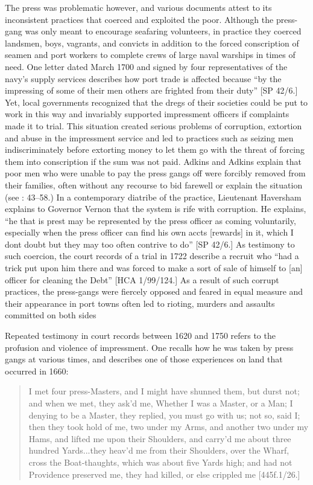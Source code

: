 The press was problematic however, and various documents attest to its inconsistent practices that coerced and exploited the poor. Although the press-gang was only meant to encourage seafaring volunteers, in practice they coerced landsmen, boys, vagrants, and convicts in addition to the forced conscription of seamen and port workers to complete crews of large naval warships in times of need. One letter dated March {1700} and signed by four representatives of the navy’s supply services describes how port trade is affected because “by the impressing of some of their men others are frighted from their duty” [SP 42/6.] Yet, local governments recognized that the dregs of their societies could be put to work in this way and invariably supported impressment officers if complaints made it to trial. This situation created serious problems of corruption, extortion and abuse in the impressment service and led to practices such as seizing men indiscriminately before extorting money to let them go with the threat of forcing them into conscription if the sum was not paid. Adkins and Adkins explain that poor men who were unable to pay the press gangs off were forcibly removed from their families, often without any recourse to bid farewell or explain the situation (see \citealt{AdkinsAdkins2008}: 43--58.) In a contemporary diatribe of the practice, Lieutenant Haversham explains to Governor Vernon that the system is rife with corruption. He explains, “he that is prest may be represented by the press officer as coming voluntarily, especially when the press officer can find his own accts [rewards] in it, which I dont doubt but they may too often contrive to do” [SP 42/6.] As testimony to such coercion, the court records of a trial in 1722 describe a recruit who “had a trick put upon him there and was forced to make a sort of sale of himself to [an] officer for cleaning the Debt” [HCA 1/99/124.] As a result of such corrupt practices, the press-gangs were fiercely opposed and feared in equal measure and their appearance in port towns often led to rioting, murders and assaults committed on both sides 

Repeated testimony in court records between 1620 and 1750 refers to the profusion and violence of impressment. One  recalls how he was taken by press gangs at various times, and describes one of those experiences on land that occurred in 1660:

\begin{quotation}
I met four press-Masters, and I might have shunned them, but durst not; and when we met, they ask’d me, Whether I was a Master, or a Man; I denying to be a Master, they replied, you must go with us; not so, said I; then they took hold of me, two under my Arms, and another two under my Hams, and lifted me upon their Shoulders, and carry’d me about three hundred Yards...they heav’d me from their Shoulders, over the Wharf, cross the Boat-thaughts, which was about five Yards high; and had not Providence preserved me, they had killed, or else crippled me [445f.1/26.]\end{quotation}

